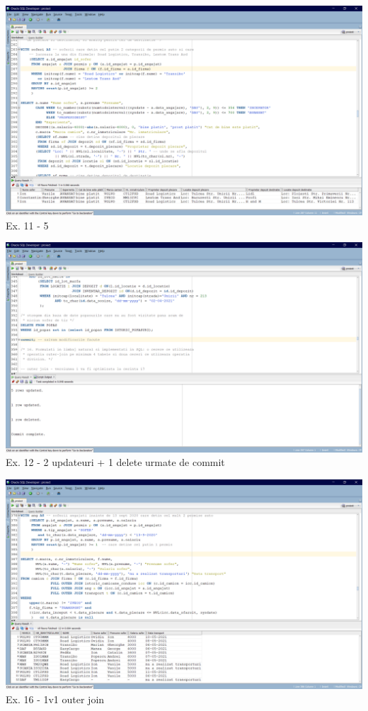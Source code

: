 \documentclass[12pt, a4paper]{article}
\begin{document}
\includegraphics[width=\textwidth]{ex11_5.png}
\label{Ex11 5}
\centering Ex. 11 - 5

\includegraphics[width=\textwidth]{ex12.png}
\label{Ex12}
\centering Ex. 12 - 2 updateuri + 1 delete urmate de commit

\includegraphics[width=\textwidth]{outer_join_1.png}
\label{Ex16 1-1}
\centering Ex. 16 - 1v1 outer join
\end{document}
